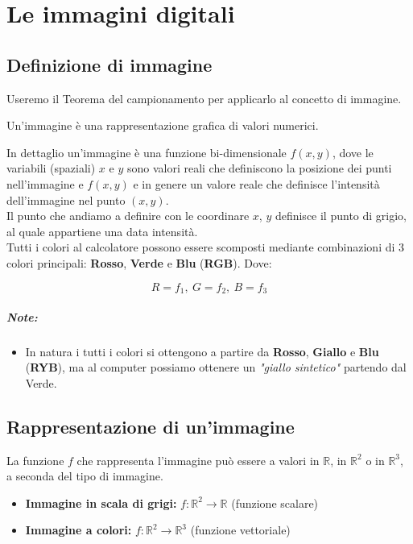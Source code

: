 \chapter{Le immagini digitali}
\section{Definizione di immagine}
Useremo il Teorema del campionamento per applicarlo al concetto di immagine.
\begin{definition}
    Un'immagine è una rappresentazione grafica di valori numerici.
\end{definition}
In dettaglio un'immagine è una funzione bi-dimensionale $f(x,y)$, dove le
variabili (spaziali) $x$ e $y$ sono valori reali che definiscono la posizione
dei punti nell'immagine e $f(x,y)$ e in genere un valore reale che definisce
l'intensità dell'immagine nel punto $(x,y)$. \\Il punto che andiamo a definire
con le coordinare $x$, $y$ definisce il punto di grigio, al quale appartiene una
data intensità.\\

Tutti i colori al calcolatore possono essere scomposti
mediante combinazioni di 3 colori principali: \textbf{Rosso}, \textbf{Verde} e
\textbf{Blu} (\textbf{RGB}). Dove:

$$
    R = f_1, \ G = f_2, \ B = f_3
$$

\paragraph{Note:}
\begin{itemize}
    \item In natura i tutti i colori si ottengono a partire da \textbf{Rosso},
          \textbf{Giallo} e \textbf{Blu} (\textbf{RYB}), ma al computer possiamo ottenere
          un \textit{"giallo sintetico"} partendo dal Verde.
\end{itemize}

\section{Rappresentazione di un'immagine}
La funzione $f$ che rappresenta l'immagine può essere a valori in $\mathbb{R}$,
in $\mathbb{R}^2$ o in $\mathbb{R}^3$, a seconda del tipo di immagine. 

\begin{itemize}
    \item \textbf{Immagine in scala di grigi:} $f:\mathbb{R}^2 \rightarrow \mathbb{R}$ (funzione
          scalare)
    \item \textbf{Immagine a colori:} $f:\mathbb{R}^2 \rightarrow \mathbb{R}^3$ (funzione
          vettoriale)
\end{itemize}

